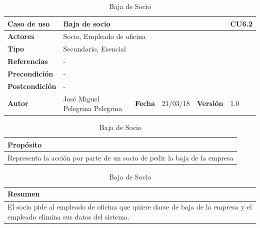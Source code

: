 \documentclass[12pt,spanish]{article}
\begin{document}
\begin{table}[H]
\centering
\begin{tabular}{|m{3cm}|m{4cm}|m{2cm}|m{2cm}|m{2cm}|m{1cm}|}
\hline
\textbf{Caso de uso} &  \multicolumn{4}{m{8cm}|}{Baja de socio} \vline &  \cellcolor{gray!40}CU6.2 \\
\hline
\textbf{Actores} & \multicolumn{5}{m{8cm}|}{Socio, Empleado de oficina} \\
\hline
\textbf{Tipo} & \multicolumn{5}{m{8cm}|}{Secundario, Esencial} \\
\hline
\textbf{Referencias} &\multicolumn{5}{m{8cm}|}{-} \\
\hline
\textbf{Precondición} & \multicolumn{5}{m{8cm}|}{-} \\
\hline
\textbf{Postcondición} & \multicolumn{5}{m{8cm}|}{-} \\
\hline
\textbf{Autor} & José Miguel Pelegrina Pelegrina & \textbf{Fecha} & 21/03/18 & \textbf{Versión} & 1.0 \\
\hline
\end{tabular}

\vspace{1cm}

\begin{tabular}{|m{16.2cm}|}
\hline
\textbf{Propósito} \\
\hline
Representa la acción por parte de un socio de pedir la baja de la empresa \\
\hline
\end{tabular}

\vspace{1cm}

\begin{tabular}{|m{16.2cm}|}
\hline
\textbf{Resumen} \\
\hline
El socio pide al empleado de oficina que quiere darse de baja de la empresa y el empleado elimina sus datos del sistema. \\
\hline
\end{tabular}

\caption{Baja de Socio}
\end{table}
\end{document}
